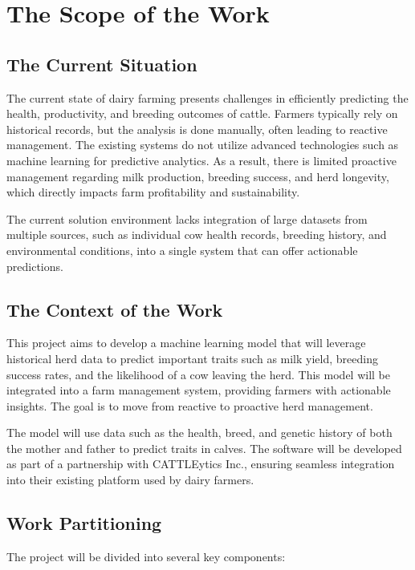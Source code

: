 \documentclass[12pt]{article}
\begin{document}
\section{The Scope of the Work}
\subsection{The Current Situation}
The current state of dairy farming presents challenges in efficiently predicting
the health, productivity, and breeding outcomes of cattle. Farmers typically 
rely on historical records, but the analysis is done manually, often leading to 
reactive management. The existing systems do not utilize advanced technologies 
such as machine learning for predictive analytics. As a result, there is 
limited proactive management regarding milk production, breeding success, and 
herd longevity, which directly impacts farm profitability and sustainability.

The current solution environment lacks integration of large datasets from 
multiple sources, such as individual cow health records, breeding history, and 
environmental conditions, into a single system that can offer actionable 
predictions.

\subsection{The Context of the Work}
This project aims to develop a machine learning model that will leverage 
historical herd data to predict important traits such as milk yield, breeding 
success rates, and the likelihood of a cow leaving the herd. This model will be 
integrated into a farm management system, providing farmers with actionable 
insights. The goal is to move from reactive to proactive herd management.

The model will use data such as the health, breed, and genetic history of both 
the mother and father to predict traits in calves. The software will be 
developed as part of a partnership with CATTLEytics Inc., ensuring seamless 
integration into their existing platform used by dairy farmers.

\subsection{Work Partitioning}
The project will be divided into several key components:
\end{document}
